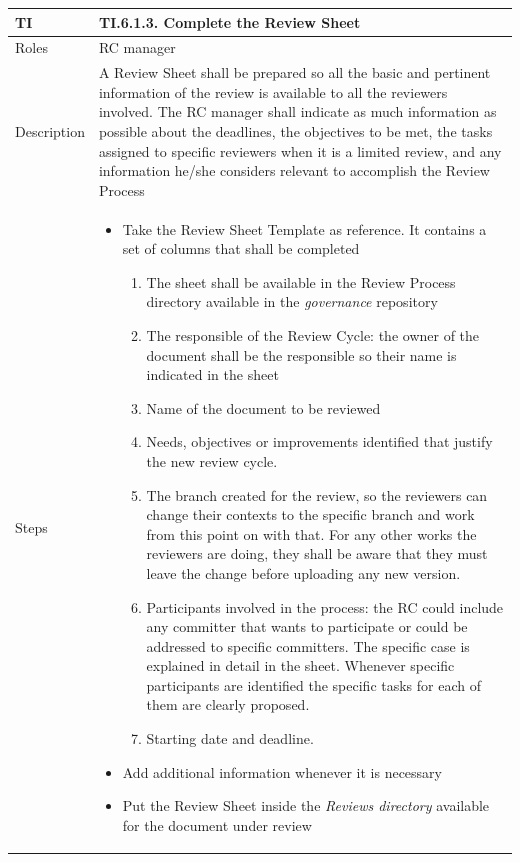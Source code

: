 \documentclass{template/openetcs_article}
\begin{document}
\begin{flushleft}
\tablefirsthead{}
\tablehead{}
\tabletail{}
\tablelasttail{}
\begin{supertabular}{|m{2cm}|m{13cm}|}
\hline
{}
TI & 
TI.6.1.3. Complete the Review Sheet
\\\hline
Roles &
RC manager
\\\hline
Description &
A Review Sheet shall be prepared so all the basic and pertinent information of the review is available to all the reviewers involved. The RC manager shall indicate as much information as possible about the deadlines, the objectives to be met, the tasks assigned to specific reviewers when it is a limited review, and any information he/she considers relevant to accomplish the Review Process
\\\hline
Steps &
\begin{itemize}
\item Take the Review Sheet Template as reference. It contains a set of columns that shall be completed
\begin{enumerate}
\item The sheet shall be available in the Review Process directory available in the {\it governance} repository
\item The responsible of the Review Cycle: the owner of the document shall be the responsible so their name is indicated in the sheet
\item Name of the document to be reviewed
\item Needs, objectives or improvements identified that justify the new review cycle.
\item The branch created for the review, so the reviewers can change their contexts to the specific branch and work from this point on with that. For any other works the reviewers are doing, they shall be aware that they must leave the change before uploading any new version.
\item Participants involved in the process: the RC could include any committer that wants to participate or could be addressed to specific committers. The specific case is explained in detail in the sheet. Whenever specific participants are identified the specific tasks for each of them are clearly proposed.
\item Starting date and deadline.
\end{enumerate}
\item Add additional information whenever it is necessary
\item Put the Review Sheet inside the {\it Reviews directory} available for the document under review
\end{itemize}
\\\hline
\end{supertabular}
\end{flushleft}
\end{document}
